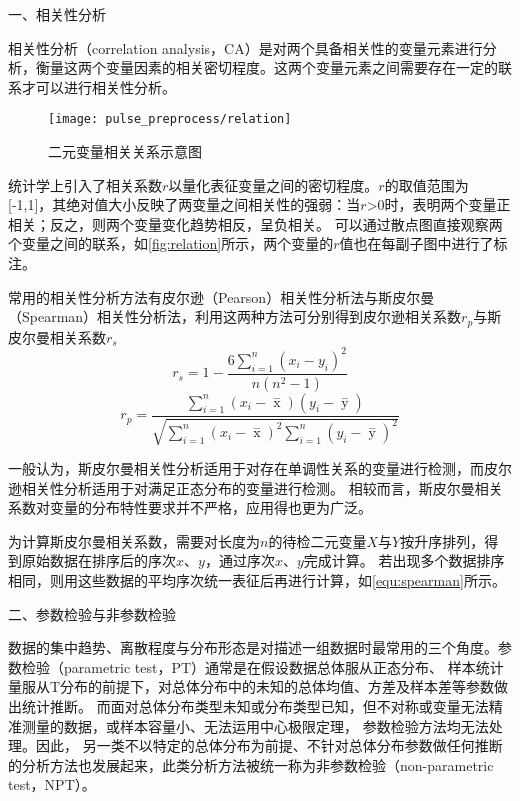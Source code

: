 一、相关性分析

相关性分析（correlation analysis，CA）是对两个具备相关性的变量元素进行分析，衡量这两个变量因素的相关密切程度\cite{Zhang2019}。这两个变量元素之间需要存在一定的联系才可以进行相关性分析。

\begin{figure}[htbp]
    \centering
    \texttt{[image: pulse\_preprocess/relation]}
    \caption[二元变量相关关系示意图]{\label{fig:relation}二元变量相关关系示意图\cite{IXL2022}}
\end{figure}

统计学上引入了相关系数$r$以量化表征变量之间的密切程度。$r$的取值范围为[-1,1]，其绝对值大小反映了两变量之间相关性的强弱：当$r$>0时，表明两个变量正相关；反之，则两个变量变化趋势相反，呈负相关。
可以通过散点图直接观察两个变量之间的联系，如\autoref{fig:relation}所示，两个变量的$r$值也在每副子图中进行了标注。

常用的相关性分析方法有皮尔逊（Pearson）相关性分析法与斯皮尔曼（Spearman）相关性分析法，利用这两种方法可分别得到皮尔逊相关系数$r_p$与斯皮尔曼相关系数$r_s$
\begin{equation}
    \label{equ:spearman}
    r_s=1-\frac{6\sum_{i=1}^{n}(x_{i}-y_{i})^2}{n(n^2-1)}
\end{equation}
\begin{equation}
    \label{equ:pearson}
    r_p=\frac{\sum_{i=1}^n{(x_i- \mathop{x} \limits^-)(y_i- \mathop{y} \limits^-)}}{\sqrt{{\sum_{i=1}^n}{{(x_i- \mathop{x} \limits^-)^2\sum_{i=1}^n}{(y_i- \mathop{y} \limits^-)^2}}}}
\end{equation}

一般认为，斯皮尔曼相关性分析适用于对存在单调性关系的变量进行检测，而皮尔逊相关性分析适用于对满足正态分布的变量进行检测。
相较而言，斯皮尔曼相关系数对变量的分布特性要求并不严格，应用得也更为广泛。

为计算斯皮尔曼相关系数，需要对长度为$n$的待检二元变量$X$与$Y$按升序排列，得到原始数据在排序后的序次$x$、$y$，通过序次$x$、$y$完成计算。
若出现多个数据排序相同，则用这些数据的平均序次统一表征后再进行计算，如\autoref{equ:spearman}所示。

二、参数检验与非参数检验

数据的集中趋势、离散程度与分布形态是对描述一组数据时最常用的三个角度\cite{Hu2021}。参数检验（parametric test，PT）通常是在假设数据总体服从正态分布、
样本统计量服从T分布的前提下，对总体分布中的未知的总体均值、方差及样本差等参数做出统计推断。
而面对总体分布类型未知或分布类型已知，但不对称或变量无法精准测量的数据，或样本容量小、无法运用中心极限定理，
参数检验方法均无法处理。因此，
另一类不以特定的总体分布为前提、不针对总体分布参数做任何推断的分析方法也发展起来，此类分析方法被统一称为非参数检验（non-parametric test，NPT）\cite{Guo2017,Hu2021,Zhang2019}。

